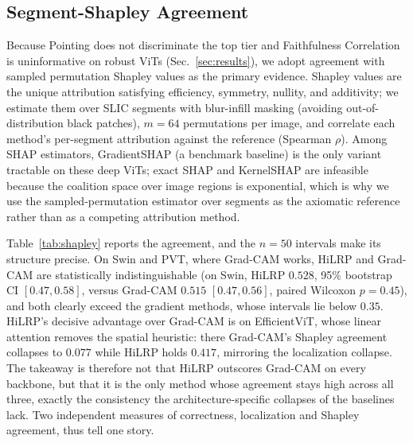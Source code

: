 \documentclass[lettersize,journal]{IEEEtran}
\begin{document}
\subsection{Segment-Shapley Agreement}
\label{sec:shapley}
Because Pointing does not discriminate the top tier and Faithfulness Correlation is uninformative on robust ViTs (Sec.~\ref{sec:results}), we adopt agreement with sampled permutation Shapley values as the primary evidence. Shapley values are the unique attribution satisfying efficiency, symmetry, nullity, and additivity; we estimate them over SLIC segments with blur-infill masking (avoiding out-of-distribution black patches), $m{=}64$ permutations per image, and correlate each method's per-segment attribution against the reference (Spearman $\rho$). Among SHAP estimators, GradientSHAP (a benchmark baseline) is the only variant tractable on these deep ViTs; exact SHAP and KernelSHAP are infeasible because the coalition space over image regions is exponential, which is why we use the sampled-permutation estimator over segments as the axiomatic reference rather than as a competing attribution method.

Table~\ref{tab:shapley} reports the agreement, and the $n{=}50$ intervals make its structure precise. On Swin and PVT, where Grad-CAM works, HiLRP and Grad-CAM are statistically indistinguishable (on Swin, HiLRP $0.528$, 95\% bootstrap CI $[0.47,0.58]$, versus Grad-CAM $0.515$ $[0.47,0.56]$, paired Wilcoxon $p=0.45$), and both clearly exceed the gradient methods, whose intervals lie below $0.35$. HiLRP's decisive advantage over Grad-CAM is on EfficientViT, whose linear attention removes the spatial heuristic: there Grad-CAM's Shapley agreement collapses to $0.077$ while HiLRP holds $0.417$, mirroring the localization collapse. The takeaway is therefore not that HiLRP outscores Grad-CAM on every backbone, but that it is the only method whose agreement stays high across all three, exactly the consistency the architecture-specific collapses of the baselines lack. Two independent measures of correctness, localization and Shapley agreement, thus tell one story.
\end{document}
